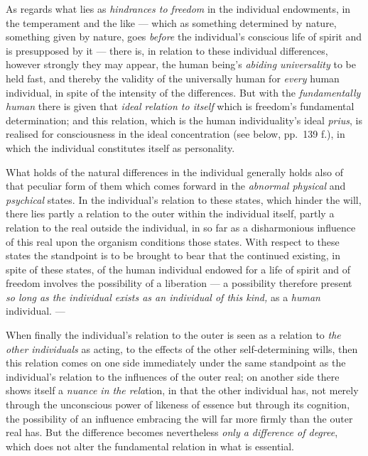 \documentclass[12pt,a4paper]{book}
\begin{document}
As regards what lies as \emph{hindrances to freedom} in the individual
endowments, in the temperament and the like --- which as something determined
by nature, something given by nature, goes \emph{before} the individual's
conscious life of spirit and is presupposed by it --- there is, in relation to
these individual differences, however strongly they may appear, the human
being's \emph{abiding universality} to be held fast, and thereby the validity
of the universally human for \emph{every} human individual, in spite of the
intensity of the differences. But with the \emph{fundamentally human} there is
given that \emph{ideal relation to itself} which is freedom's fundamental
determination; and this relation, which is the human individuality's ideal
\textit{prius}, is realised for consciousness in the ideal concentration (see
below, pp.\ 139 f.), in which the individual constitutes itself as personality.

What holds of the natural differences in the individual generally holds also of
that peculiar form of them which comes forward in the \emph{abnormal physical}
and \emph{psychical} states. In the individual's relation to these states,
which hinder the will, there lies partly a relation to the outer within the
individual itself, partly a relation to the real outside the individual, in so
far as a disharmonious influence of this real upon the organism conditions
those states. With respect to these states the standpoint is to be brought to
bear that the continued existing, in spite of these states, of the human
individual endowed for a
life of spirit and of freedom involves the possibility of a liberation --- a
possibility therefore present \emph{so long as the individual exists as an
individual of this kind,} as a \emph{human} individual. ---

When finally the individual's relation to the outer is seen as a relation to
\emph{the other individuals} as acting, to the effects of the other
self-determining wills, then this relation comes on one side immediately under
the same standpoint as the individual's relation to the influences of the outer
real; on another side there shows itself a \emph{nuance in the rela}tion, in
that the other individual has, not merely through the unconscious power of
likeness of essence but through its cognition, the possibility of an influence
embracing the will far more firmly than the outer real has. But the difference
becomes nevertheless \emph{only a difference of degree}, which does not alter
the fundamental relation in what is essential.
\end{document}
